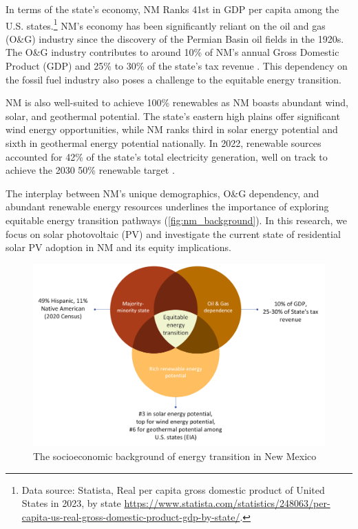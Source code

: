 \documentclass[12pt,twoside,letterpaper]{article}
\begin{document}
In terms of the state's economy, NM Ranks 41st in GDP per capita among the U.S. states.\footnote{Data source: Statista, Real per capita gross domestic product of United States in 2023, by state \url{https://www.statista.com/statistics/248063/per-capita-us-real-gross-domestic-product-gdp-by-state/}.} NM's economy has been significantly reliant on the oil and gas (O\&G) industry since the discovery of the Permian Basin oil fields in the 1920s. The O\&G industry contributes to around 10\% of NM's annual Gross Domestic Product (GDP) and 25\% to 30\% of the state's tax revenue \parencite{eia2023nm, nmlegislative2023}. This dependency on the fossil fuel industry also poses a challenge to the equitable energy transition.

NM is also well-suited to achieve 100\% renewables as NM boasts abundant wind, solar, and geothermal potential. The state's eastern high plains offer significant wind energy opportunities, while NM ranks third in solar energy potential and sixth in geothermal energy potential nationally. In 2022, renewable sources accounted for 42\% of the state's total electricity generation, well on track to achieve the 2030 50\% renewable target \parencite{eia2023energy}.

The interplay between NM's unique demographics, O\&G dependency, and abundant renewable energy resources underlines the importance of exploring equitable energy transition pathways (\autoref{fig:nm_background}). In this research, we focus on solar photovoltaic (PV) and investigate the current state of residential solar PV adoption in NM and its equity implications. 

\begin{figure}[!ht]
    \centering
    \includegraphics[width=1\textwidth]{figures/nm_background.png}
    \caption{The socioeconomic background of energy transition in New Mexico}
    \label{fig:nm_background}
\end{figure}
\end{document}
